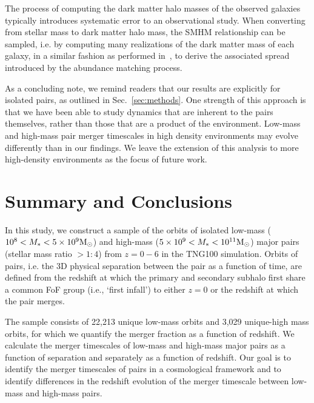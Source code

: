 \documentclass[twocolumn,linenumbers]{aastex631}
\newcommand{\chambe}{\citet{Chamberlain2024}}
\begin{document}
            The process of computing the dark matter halo masses of the observed galaxies typically introduces systematic error to an observational study.
            When converting from stellar mass to dark matter halo mass, the SMHM relationship can be sampled, i.e. by computing many realizations of the dark matter mass of each galaxy, in a similar fashion as performed in~\chambe{}, to derive the associated spread introduced by the abundance matching process.
            
            
            As a concluding note, we remind readers that our results are explicitly for isolated pairs, as outlined in Sec.~\ref{sec:methods}. 
            One strength of this approach is that we have been able to study dynamics that are inherent to the pairs themselves, rather than those that are a product of the environment. 
            Low-mass and high-mass pair merger timescales in high density environments may evolve differently than in our findings. 
            We leave the extension of this analysis to more high-density environments as the focus of future work. 
   
\section{Summary and Conclusions}\label{sec:conclusions}
    In this study, we construct a sample of the orbits of isolated low-mass ($10^8 <M_{*{}}<5\times10^{9}\mathrm{M}_\odot$) and high-mass ($5\times10^{9}<M_{*{}}<10^{11}\mathrm{M}_\odot$) major pairs (stellar mass ratio $> 1:4$) from $z=0-6$ in the TNG100 simulation.
    Orbits of pairs, i.e. the 3D physical separation between the pair as a function of time, are defined from the redshift at which the primary and secondary subhalo first share a common FoF group (i.e., `first infall') to either $z=0$ or the redshift at which the pair merges.
    
    The sample consists of 22,213 unique low-mass orbits and 3,029 unique-high mass orbits, for which we quantify the merger fraction as a function of redshift.
    We calculate the merger timescales of low-mass and high-mass major pairs as a function of separation and separately as a function of redshift. 
    Our goal is to identify the merger timescales of pairs in a cosmological framework and to identify differences in the redshift evolution of the merger timescale between low-mass and high-mass pairs. 
    
\end{document}
